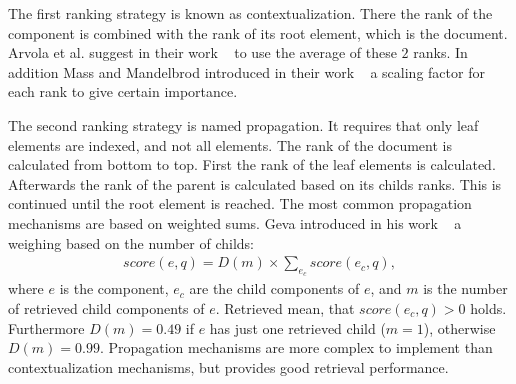 The first ranking strategy is known as contextualization. There the rank of the component is combined with the rank of its root element, which is the document. Arvola et al. suggest in their work ~\cite{ArvolaJK05} to use the average of these $2$ ranks. In addition Mass and Mandelbrod introduced in their work ~\cite{MassM04} a scaling factor for each rank to give certain importance.

The second ranking strategy is named propagation. It requires that only leaf elements are indexed, and not all elements. The rank of the document is calculated from bottom to top. First the rank of the leaf elements is calculated. Afterwards the rank of the parent is calculated based on its childs ranks. This is continued until the root element is reached. The most common propagation mechanisms are based on weighted sums. Geva introduced in his work ~\cite{GS2005} a weighing based on the number of childs:
\begin{align}
  \mathit{score}(e, q) = D(m) \times \sum_{e_c} \mathit{score}(e_c, q),
\end{align}
where $e$ is the component, $e_c$ are the child components of $e$, and $m$ is the number of retrieved child components of $e$. Retrieved mean, that $\mathit{score}(e_c, q) > 0$ holds. Furthermore $D(m) = 0.49$ if $e$ has just one retrieved child ($m = 1$), otherwise $D(m) = 0.99$. Propagation mechanisms are more complex to implement than contextualization mechanisms, but provides good retrieval performance.

